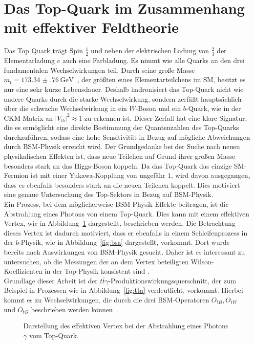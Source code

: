 \section{Das Top-Quark im Zusammenhang mit effektiver Feldtheorie}
\label{top}
Das Top Quark trägt Spin $\frac{1}{2}$ und neben der elektrischen Ladung von $\frac{2}{3}$ der
Elementarladung $e$ auch eine Farbladung. Es nimmt wie alle Quarks an den drei fundamentalen Wechselwirkungen
teil. Durch seine große Masse $m_t = \SI{173.34(76)}{\giga\electronvolt}$~\cite{ATLAS:2014wva}, der größten eines
Elementarteilchens im SM, besitzt es nur eine sehr kurze Lebensdauer. Deshalb hadronisiert das
Top-Quark nicht wie andere Quarks durch die starke Wechselwirkung, sondern zerfällt hauptsächlich über die schwache Wechselwirkung in ein $W$-Boson und ein $b$-Quark, wie in der CKM-Matrix an $|V_{tb}|^2 \approx 1$ zu erkennen ist.
Dieser Zerfall hat eine klare Signatur, die es ermöglicht eine direkte Bestimmung der Quantenzahlen des Top-Quarks durchzuführen, sodass eine hohe Sensitivität in Bezug auf mögliche Abweichungen durch BSM-Physik erreicht wird.
Der Grundgedanke bei der Suche nach neuen physikalischen Effekten ist, dass neue Teilchen auf Grund ihrer großen Masse besonders stark an das Higgs-Boson koppeln. Da das Top-Quark das einzige SM-Fermion ist mit einer Yukawa-Kopplung von ungefähr $1$, wird davon ausgegangen, dass es ebenfalls besonders stark an die neuen Teilchen koppelt. Dies motiviert eine genaue Untersuchung des Top-Sektors in Bezug auf BSM-Physik.\\
Ein Prozess, bei dem möglicherweise BSM-Physik-Effekte beitragen, ist die Abstrahlung eines Photons von einem Top-Quark. Dies kann mit einem effektiven Vertex, wie in Abbildung~\ref{fig:eftVertex} dargestellt, beschrieben werden. Die Betrachtung dieses Vertex ist dadurch motiviert, dass er ebenfalls in einem Schleifenprozess in der $b$-Physik, wie in Abbildung~\ref{fig:bsa} dargestellt, vorkommt. Dort wurde bereits nach Auswirkungen von BSM-Physik gesucht. Daher ist es interessant zu untersuchen, ob die Messungen der an dem Vertex beteiligten Wilson-Koeffizienten in der Top-Physik konsistent sind .\\
Grundlage dieser Arbeit ist der $t\bar{t}\gamma$-Produktionswirkungsquerschnitt, der zum Beispiel in Prozessen wie in Abbildung~\ref{fig:tta} verdeutlicht, vorkommt. Hierbei kommt es zu Wechselwirkungen, die durch die drei BSM-Operatoren $O_{tB}, O_{tW}$ und $O_{tG}$ beschrieben werden können~\cite{Bylund:2016phk}.
\begin{figure}
  \centering
  \caption{Darstellung des effektiven Vertex bei der Abstrahlung eines Photons $\gamma$ vom Top-Quark.}
  \label{fig:eftVertex}
\end{figure}
